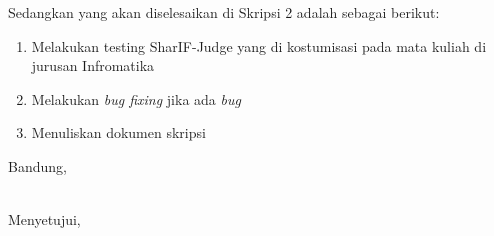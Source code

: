 \documentclass[a4paper,twoside]{article}
\begin{document}
Sedangkan yang akan diselesaikan di Skripsi 2 adalah sebagai berikut:
\begin{enumerate}
\item Melakukan testing SharIF-Judge yang di kostumisasi pada mata kuliah di jurusan Infromatika
\item Melakukan \textit{bug fixing} jika ada \textit{bug}
\item Menuliskan dokumen skripsi
\end{enumerate}

\vspace{1cm}
\centering Bandung, \tanggal\\
\vspace{2cm} \nama \\ 
\vspace{1cm}

Menyetujui, \\
\end{document}

